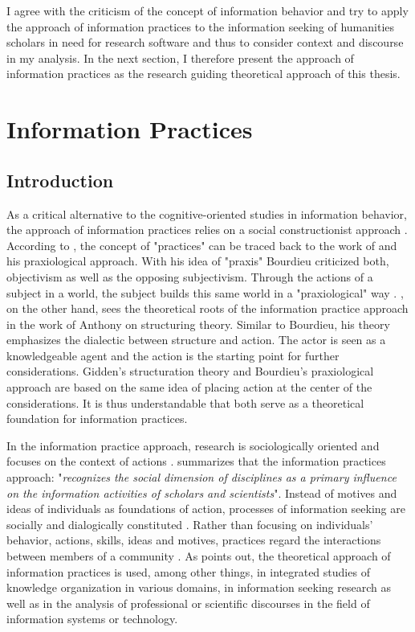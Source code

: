 \documentclass[12pt, a4paper, titlepage, oneside, abstract=true, toc=listof, toc=bibliography, BCOR=1cm]{scrreprt}
\begin{document}
I agree with the criticism of the concept of information behavior and try to apply the approach of information practices to the information seeking of humanities scholars in need for research software and thus to consider context and discourse in my analysis. In the next section, I therefore present the approach of information practices as the research guiding theoretical approach of this thesis. 

\section{Information Practices}
\label{sec:IP}
\subsection{Introduction}
As a critical alternative to the cognitive-oriented studies in information behavior, the approach of information practices relies on a social constructionist approach \citep{Savolainen2007}. According to \citet[p. 102]{Araujo2019}, the concept of "practices" can be traced back to the work of \citet{Bourdieu1994} and his praxiological approach. With his idea of "praxis" Bourdieu criticized both, objectivism as well as the opposing subjectivism. Through the actions of a subject in a world, the subject builds this same world in a "praxiological" way \citep[p. 102]{Araujo2019}. \citet[p. 120]{Savolainen2007}, on the other hand, sees the theoretical roots of the information practice approach in the work of Anthony \citet{Giddens1984} on structuring theory. Similar to Bourdieu, his theory emphasizes the dialectic between structure and action. The actor is seen as a knowledgeable agent and the action is the starting point for further considerations. Gidden's structuration theory and Bourdieu's praxiological approach are based on the same idea of placing action at the center of the considerations. It is thus understandable that both serve as a theoretical foundation for information practices. 

In the information practice approach, research is sociologically oriented and focuses on the context of actions \citep{Talja2005a}. \citet{Palmer2009} summarizes that the information practices approach: "\textit{recognizes the social dimension of disciplines as a primary influence on the information activities of scholars and scientists}". Instead of motives and ideas of individuals as foundations of action, processes of information seeking are socially and dialogically constituted \citep[p. 120]{Savolainen2007}. Rather than focusing on individuals' behavior, actions, skills, ideas and motives, practices regard the interactions between members of a community \citep{Tuominen2005}. As \citet[p. 93]{Talja2005} points out, the theoretical approach of information practices is used, among other things, in integrated studies of knowledge organization in various domains, in information seeking research as well as in the analysis of professional or scientific discourses in the field of information systems or technology. 
\end{document}
